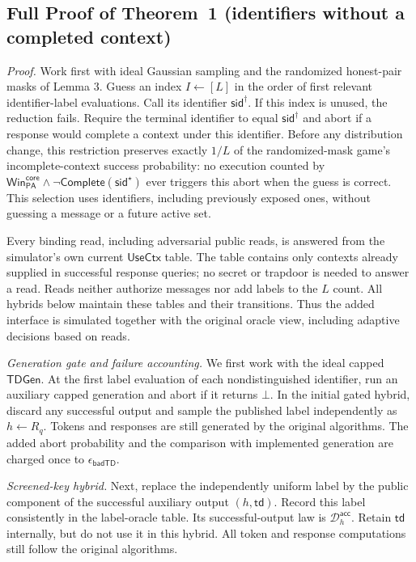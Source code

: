 \documentclass[lettersize,journal]{IEEEtran}
\begin{document}
	\subsection{Full Proof of Theorem~1 (identifiers without a completed context)}
	\label{app:talon-theorem1-proof}
	
	\emph{Proof.}
	Work first with ideal Gaussian sampling and the randomized honest-pair
	masks of Lemma 3. Guess an index $I\leftarrow[L]$ in the order of first
	relevant identifier-label evaluations. Call its identifier
	$\mathsf{sid}^{\dagger}$. If this index is unused, the reduction fails.
	Require the terminal identifier to equal $\mathsf{sid}^{\dagger}$ and abort
	if a response would complete a context under this identifier. Before any
	distribution change, this restriction preserves exactly
	$1/L$ of the randomized-mask game's
	incomplete-context success probability: no execution counted by
	$\mathsf{Win}_{\mathsf{PA}}^{\mathsf{core}}
	\wedge\neg\mathsf{Complete}(\mathsf{sid}^{\star})$
	ever triggers this abort when the guess is correct. This selection
	uses identifiers, including previously exposed ones, without guessing a
	message or a future active set.
	
	Every binding read, including adversarial public reads, is answered from
	the simulator's own current $\mathsf{UseCtx}$ table. The table contains
	only contexts already supplied in successful response queries; no secret
	or trapdoor is needed to answer a read. Reads neither authorize messages
	nor add labels to the $L$ count. All hybrids below maintain these tables
	and their transitions. Thus the added interface is simulated together with
	the original oracle view, including adaptive decisions based on reads.
	
	\emph{Generation gate and failure accounting.}
	We first work with the ideal capped $\mathsf{TDGen}$.
	At the first label evaluation of each nondistinguished identifier,
	run an auxiliary capped generation and abort if it returns $\bot$.
	In the initial gated hybrid, discard any successful output and
	sample the published label independently as $h\leftarrow R_q$.
	Tokens and responses are still generated by the original algorithms.
	The added abort probability and the comparison with implemented
	generation are charged once to $\epsilon_{\mathsf{badTD}}$.
	
	\emph{Screened-key hybrid.}
	Next, replace the independently uniform label by the public component
	of the successful auxiliary output $(h,\mathsf{td})$.
	Record this label consistently in the label-oracle table.
	Its successful-output law is $\mathcal D_h^{\mathsf{acc}}$.
	Retain $\mathsf{td}$ internally, but do not use it in this hybrid.
	All token and response computations still follow the original algorithms.
	
\end{document}
